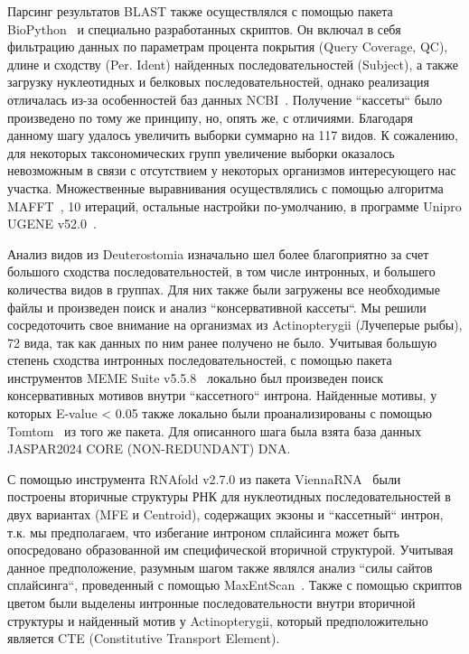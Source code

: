Парсинг результатов BLAST также осуществлялся с помощью пакета BioPython~\cite{biopython} и специально разработанных скриптов.
Он включал в себя фильтрацию данных по параметрам процента покрытия (Query Coverage, QC), длине и сходству (Per. Ident) найденных последовательностей (Subject), а также загрузку нуклеотидных и белковых последовательностей, однако реализация отличалась из-за особенностей баз данных NCBI~\cite{ncbi_general}.
Получение ``кассеты`` было произведено по тому же принципу, но, опять же, с отличиями.
Благодаря данному шагу удалось увеличить выборки суммарно на 117 видов.
К сожалению, для некоторых таксономических групп увеличение выборки оказалось невозможным в связи с отсутствием у некоторых организмов интересующего нас участка.
Множественные выравнивания осуществлялись с помощью алгоритма MAFFT~\cite{mafft}, 10 итераций, остальные настройки по-умолчанию, в программе Unipro UGENE v52.0~\cite{ugene}.

Анализ видов из Deuterostomia изначально шел более благоприятно за счет большого сходства последовательностей, в том числе интронных, и большего количества видов в группах.
Для них также были загружены все необходимые файлы и произведен поиск и анализ ``консервативной кассеты``.
Мы решили сосредоточить свое внимание на организмах из Actinopterygii (Лучеперые рыбы), 72 вида, так как данных по ним ранее получено не было.
Учитывая большую степень сходства интронных последовательностей, с помощью пакета инструментов MEME Suite v5.5.8~\cite{meme} локально был произведен поиск консервативных мотивов внутри ``кассетного`` интрона.
Найденные мотивы, у которых E-value < 0.05 также локально были проанализированы с помощью Tomtom~\cite{tomtom} из того же пакета.
Для описанного шага была взята база данных JASPAR2024 CORE (NON-REDUNDANT) DNA.

С помощью инструмента RNAfold v2.7.0 из пакета Vienna\-RNA~\cite{viennarna} были построены вторичные структуры РНК для нуклеотидных последовательностей в двух вариантах (MFE и Centroid), содержащих экзоны и ``кассетный`` интрон, т.к. мы предполагаем, что избегание интроном сплайсинга может быть опосредовано образованной им специфической вторичной структурой.
Учитывая данное предположение, разумным шагом также являлся анализ ``силы сайтов сплайсинга``, проведенный с помощью MaxEntScan~\cite{maxentsccan}.
Также с помощью скриптов цветом были выделены интронные последовательности внутри вторичной структуры и найденный мотив у Actinopterygii, который предположительно является CTE (Constitutive Transport Element).

